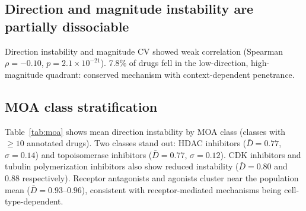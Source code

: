 \documentclass{article}
\begin{document}
\subsection{Direction and magnitude instability are partially dissociable}

Direction instability and magnitude CV showed weak correlation (Spearman
$\rho = -0.10$, $p = 2.1 \times 10^{-21}$). 7.8\% of drugs fell in
the low-direction, high-magnitude quadrant: conserved mechanism with
context-dependent penetrance.

\subsection{MOA class stratification}

Table~\ref{tab:moa} shows mean direction instability by MOA class (classes
with $\geq10$ annotated drugs). Two classes stand out: HDAC inhibitors
($\bar{D} = 0.77$, $\sigma = 0.14$) and topoisomerase inhibitors
($\bar{D} = 0.77$, $\sigma = 0.12$). CDK inhibitors and tubulin
polymerization inhibitors also show reduced instability ($\bar{D} = 0.80$
and $0.88$ respectively). Receptor antagonists and agonists cluster near
the population mean ($\bar{D} = 0.93$--$0.96$), consistent with
receptor-mediated mechanisms being cell-type-dependent.
\end{document}
